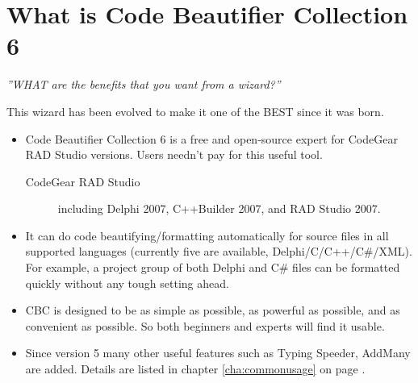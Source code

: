 \chapter{What is Code Beautifier Collection 6}
\emph{''WHAT are the benefits that you want from a wizard?''}

This wizard has been evolved to make it one of the BEST since it was
born. \piccbc
\newpage

\begin{itemize}
\item Code Beautifier Collection 6 is a free and open-source expert
for CodeGear RAD Studio versions. Users needn't pay for this
useful tool.
	\begin{description}
	\item[CodeGear RAD Studio] including Delphi 2007, C++Builder
	2007, and RAD Studio 2007.
	\end{description}
\item It can do code beautifying/formatting automatically for source files in
all supported languages (currently five are available, Delphi/\-C/\-C++\-/C\#/\-XML). For example, a project group of both Delphi and C\# files can be formatted quickly without any tough setting ahead.

\item CBC is designed to be as simple as possible, as powerful as possible, and as convenient as possible. So both beginners and experts will find it usable.

\item Since version 5 many other useful features such as Typing Speeder,
AddMany are added. Details are listed in chapter \ref{cha:commonusage} on page \pageref{cha:commonusage}.
\end{itemize}



